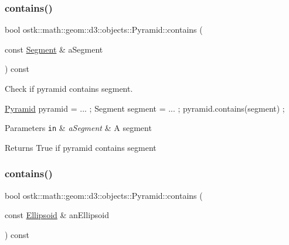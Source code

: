 \subsubsection{\texorpdfstring{contains()}{contains()}\hspace{0.1cm}{\footnotesize\ttfamily [3/4]}}
{\footnotesize\ttfamily bool ostk\+::math\+::geom\+::d3\+::objects\+::\+Pyramid\+::contains (\begin{DoxyParamCaption}\item[{const \hyperlink{classostk_1_1math_1_1geom_1_1d3_1_1objects_1_1_segment}{Segment} \&}]{a\+Segment }\end{DoxyParamCaption}) const}



Check if pyramid contains segment. 


\begin{DoxyCode}
\hyperlink{classostk_1_1math_1_1geom_1_1d3_1_1objects_1_1_pyramid_a5560d123994714b36d4737b358dadcea}{Pyramid} pyramid = ... ;
Segment segment = ... ;
pyramid.contains(segment) ;
\end{DoxyCode}



\begin{DoxyParams}[1]{Parameters}
\mbox{\tt in}  & {\em a\+Segment} & A segment \\
\hline
\end{DoxyParams}
\begin{DoxyReturn}{Returns}
True if pyramid contains segment 
\end{DoxyReturn}
\mbox{\label{classostk_1_1math_1_1geom_1_1d3_1_1objects_1_1_pyramid_a761592bada278f4a80f910e3e234fde8}} 
\subsubsection{\texorpdfstring{contains()}{contains()}\hspace{0.1cm}{\footnotesize\ttfamily [4/4]}}
{\footnotesize\ttfamily bool ostk\+::math\+::geom\+::d3\+::objects\+::\+Pyramid\+::contains (\begin{DoxyParamCaption}\item[{const \hyperlink{classostk_1_1math_1_1geom_1_1d3_1_1objects_1_1_ellipsoid}{Ellipsoid} \&}]{an\+Ellipsoid }\end{DoxyParamCaption}) const}



